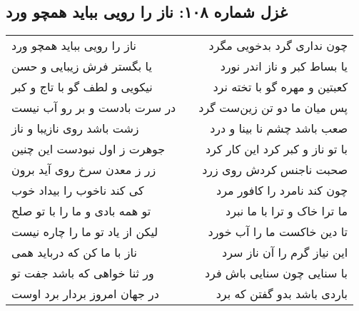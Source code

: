 \begin{center}
\section*{غزل شماره ۱۰۸: ناز را رویی بباید همچو ورد}
\label{sec:108}
\begin{longtable}{l p{0.5cm} r}
ناز را رویی بباید همچو ورد
&&
چون نداری گرد بدخویی مگرد
\\
یا بگستر فرش زیبایی و حسن
&&
یا بساط کبر و ناز اندر نورد
\\
نیکویی و لطف گو با تاج و کبر
&&
کعبتین و مهره گو با تخته نرد
\\
در سرت بادست و بر رو آب نیست
&&
پس میان ما دو تن زین‌ست گرد
\\
زشت باشد روی نازیبا و ناز
&&
صعب باشد چشم نا بینا و درد
\\
جوهرت ز اول نبودست این چنین
&&
با تو ناز و کبر کرد این کار کرد
\\
زر ز معدن سرخ روی آید برون
&&
صحبت ناجنس کردش روی زرد
\\
کی کند ناخوب را بیداد خوب
&&
چون کند نامرد را کافور مرد
\\
تو همه بادی و ما را با تو صلح
&&
ما ترا خاک و ترا با ما نبرد
\\
لیکن از یاد تو ما را چاره نیست
&&
تا دین خاکست ما را آب خورد
\\
ناز با ما کن که درباید همی
&&
این نیاز گرم را آن ناز سرد
\\
ور ثنا خواهی که باشد جفت تو
&&
با سنایی چون سنایی باش فرد
\\
در جهان امروز بردار برد اوست
&&
باردی باشد بدو گفتن که برد
\\
\end{longtable}
\end{center}
